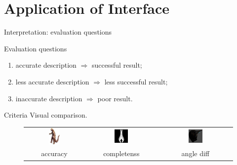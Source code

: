 \documentclass[10pt]{beamer}
\begin{document}
\section{Application of Interface}
\begin{frame}{Interpretation: evaluation questions}

\begin{exampleblock}{Evaluation questions}
\begin{enumerate}
  \item accurate description $\Rightarrow$ successful result;
  \item less accurate description $\Rightarrow$ less successful result;
  \item inaccurate description $\Rightarrow$ poor result.
\end{enumerate}
\end{exampleblock}

\begin{exampleblock}{Criteria}
  Visual comparison.
\end{exampleblock}

\begin{figure}
\centering
\begin{tabular}{ccc}
\includegraphics[width=0.2\textwidth]{images/dino.png} &
\includegraphics[width=0.2\textwidth]{interp/synth_interp/vase0_sl} &
\includegraphics[width=0.2\textwidth]{interp/real_interp/vase/vase_spike} \\
accuracy & completenss & angle diff \\
\end{tabular}
\end{figure}

\end{frame}
\end{document}
